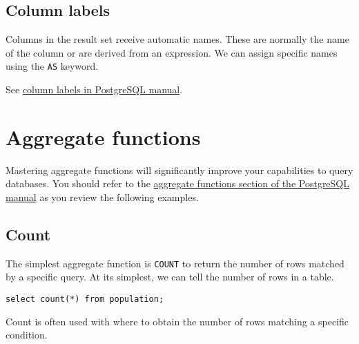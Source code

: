 \subsection{Column labels}\label{column-labels}

Columns in the result set receive automatic names. These are normally
the name of the column or are derived from an expression. We can assign
specific names using the \texttt{AS} keyword.


See
\href{https://www.postgresql.org/docs/13/queries-select-lists.html\#QUERIES-COLUMN-LABELS}{column
labels in PostgreSQL manual}.

\section{Aggregate functions}\label{aggregate-functions}

Mastering aggregate functions will significantly improve your
capabilities to query databases. You should refer to the
\href{https://www.postgresql.org/docs/13/functions-aggregate.html}{aggregate
functions section of the PostgreSQL manual} as you review the following
examples.

\subsection{Count}\label{count}

The simplest aggregate function is \texttt{COUNT} to return the number
of rows matched by a specific query. At its simplest, we can tell the
number of rows in a table.

\begin{verbatim}
select count(*) from population; 
\end{verbatim}

Count is often used with where to obtain the number of rows matching a
specific condition.





